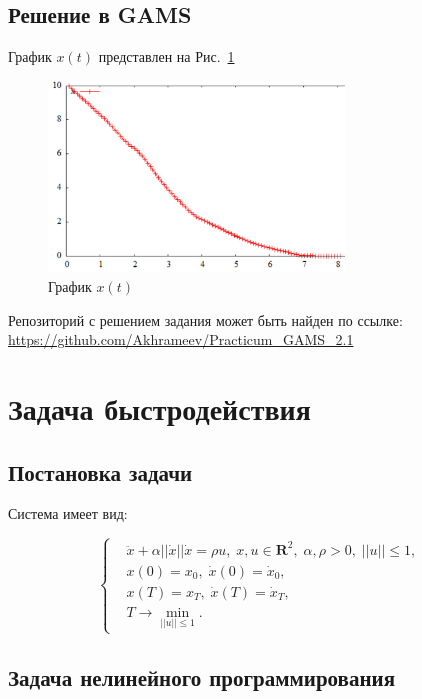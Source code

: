 \documentclass[14pt]{article}
\begin{document}
\subsection{Решение в GAMS}

График $x(t)$ представлен на Рис.~\ref{x_t_task_2_1}

\begin{figure}
\centering
\includegraphics[width=0.7\textwidth]{x_t_task_2_1}
\caption{График $x(t)$}
\label{x_t_task_2_1}
\end{figure}

Репозиторий с решением задания может быть найден по ссылке:
\url{https://github.com/Akhrameev/Practicum_GAMS_2.1}

\section{Задача быстродействия}
\subsection{Постановка задачи}

Система имеет вид:

\begin{equation}\label{syst2}
\left\{ \begin{aligned}
& \ddot{x}+\alpha||\dot{x}||\dot{x} = \rho u, \; x,u \in \textbf{R}^2, \; \alpha,\rho > 0,\;  ||u|| \le 1, \\
& x(0)=x_0, \; \dot{x}(0) = \dot{x}_0, \\
& x(T)=x_T, \; \dot{x}(T) = \dot{x}_T, \\
& T \rightarrow \min_{||u|| \le 1}.
\end{aligned}\right.
\end{equation}

\subsection{Задача нелинейного программирования}
\end{document}
